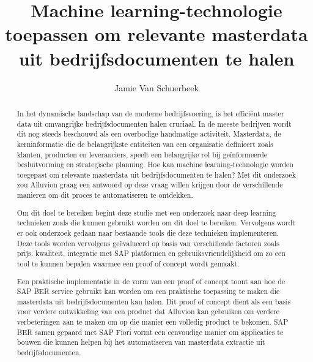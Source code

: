\documentclass[a0,portrait]{hogent-poster}
\title{Machine learning-technologie toepassen om relevante masterdata uit bedrijfsdocumenten te halen}
\author{Jamie Van Schuerbeek}
\begin{document}
\maketitle

\begin{abstract}
  In het dynamische landschap van de moderne bedrijfsvoering, is het efficiënt master data uit omvangrijke bedrijfsdocumenten halen cruciaal. In de meeste bedrijven wordt dit nog steeds beschouwd als een overbodige handmatige activiteit. Masterdata, de kerninformatie die de belangrijkste entiteiten van een organisatie definieert zoals klanten, producten en leveranciers, speelt een belangrijke rol bij geïnformeerde besluitvorming en strategische planning. Hoe kan machine learning-technologie worden toegepast om relevante masterdata uit bedrijfsdocumenten te halen? Met dit onderzoek zou Alluvion graag een antwoord op deze vraag willen krijgen door de verschillende manieren om dit proces te automatiseren te ontdekken.
  
  Om dit doel te bereiken begint deze studie met een onderzoek naar deep learning technieken zoals die kunnen gebruikt worden om dit doel te bereiken. Vervolgens wordt er ook onderzoek gedaan naar bestaande tools die deze technieken implementeren. Deze tools worden vervolgens geëvalueerd op basis van verschillende factoren zoals prijs, kwaliteit, integratie met SAP platformen en gebruiksvriendelijkheid om zo een tool te kunnen bepalen waarmee een proof of concept wordt gemaakt.
  
  Een praktische implementatie in de vorm van een proof of concept toont aan hoe de SAP BER service gebruikt kan worden om een praktische toepassing te maken die masterdata uit bedrijfsdocumenten kan halen. Dit proof of concept dient als een basis voor verdere ontwikkeling van een product dat Alluvion kan gebruiken om verdere verbeteringen aan te maken om op die manier een volledig product te bekomen. SAP BER samen gepaard met SAP Fiori vormt een eenvoudige manier om applicaties te bouwen die kunnen helpen bij het automatiseren van masterdata extractie uit bedrijfsdocumenten.
  
\end{abstract}
\end{document}
